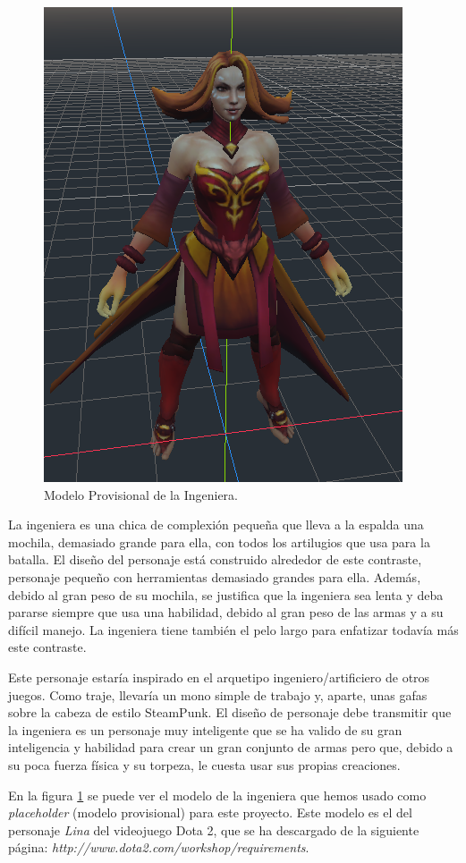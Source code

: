 \begin{figure}[h]
	\centering
	\includegraphics[width=0.6\linewidth]{figures/EngineerModel.png}
	\caption{Modelo Provisional de la Ingeniera.}
	\label{fig:EngineerModel}
\end{figure}

La ingeniera es una chica de complexión pequeña que lleva a la espalda una mochila, demasiado grande para ella, con todos los artilugios que usa para la batalla. El diseño del personaje está construido alrededor de este contraste, personaje pequeño con herramientas demasiado grandes para ella. Además, debido al gran peso de su mochila, se justifica que la ingeniera sea lenta y deba pararse siempre que usa una habilidad, debido al gran peso de las armas y a su difícil manejo. La ingeniera tiene también el pelo largo para enfatizar todavía más este contraste.

Este personaje estaría inspirado en el arquetipo ingeniero/artificiero de otros juegos. Como traje, llevaría un mono simple de trabajo y, aparte, unas gafas sobre la cabeza de estilo SteamPunk. El diseño de personaje debe transmitir que la ingeniera es un personaje muy inteligente que se ha valido de su gran inteligencia y habilidad para crear un gran conjunto de armas pero que, debido a su poca fuerza física y su torpeza, le cuesta usar sus propias creaciones.

En la figura \ref{fig:EngineerModel} se puede ver el modelo de la ingeniera que hemos usado como \emph{placeholder} (modelo provisional) para este proyecto. Este modelo es el del personaje \emph{Lina} del videojuego Dota 2, que se ha descargado de la siguiente página: \emph{http://www.dota2.com/workshop/requirements}.

